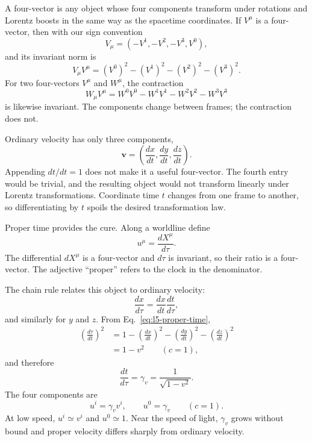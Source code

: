 A four-vector is any object whose four components transform under rotations
and Lorentz boosts in the same way as the spacetime coordinates. If \(V^\mu\)
is a four-vector, then with our sign convention
\begin{equation}
V_\mu=(-V^1,-V^2,-V^3,V^0),
\end{equation}
and its invariant norm is
\begin{equation}
V_\mu V^\mu=(V^0)^2-(V^1)^2-(V^2)^2-(V^3)^2.
\end{equation}
For two four-vectors \(V^\mu\) and \(W^\mu\), the contraction
\begin{equation}
W_\mu V^\mu
=W^0V^0-W^1V^1-W^2V^2-W^3V^3
\end{equation}
is likewise invariant. The components change between frames; the contraction
does not.

Ordinary velocity has only three components,
\begin{equation}
\mathbf v=\left(\frac{dx}{dt},\frac{dy}{dt},\frac{dz}{dt}\right).
\end{equation}
Appending \(dt/dt=1\) does not make it a useful four-vector. The fourth entry
would be trivial, and the resulting object would not transform linearly under
Lorentz transformations. Coordinate time \(t\) changes from one frame to
another, so differentiating by \(t\) spoils the desired transformation law.

Proper time provides the cure. Along a worldline define
\begin{equation}
u^\mu=\frac{dX^\mu}{d\tau}.
\label{eq:l5-four-velocity}
\end{equation}
The differential \(dX^\mu\) is a four-vector and \(d\tau\) is invariant, so
their ratio is a four-vector. The adjective ``proper'' refers to the clock in
the denominator.

The chain rule relates this object to ordinary velocity:
\begin{equation}
\frac{dx}{d\tau}=\frac{dx}{dt}\frac{dt}{d\tau},
\end{equation}
and similarly for \(y\) and \(z\). From
Eq.~\eqref{eq:l5-proper-time},
\begin{align}
\left(\frac{d\tau}{dt}\right)^2
&=1-\left(\frac{dx}{dt}\right)^2
    -\left(\frac{dy}{dt}\right)^2
    -\left(\frac{dz}{dt}\right)^2\nonumber\\
&=1-v^2
\qquad(c=1),
\end{align}
and therefore
\begin{equation}
\frac{dt}{d\tau}=\gamma_v=\frac{1}{\sqrt{1-v^2}}.
\end{equation}
The four components are
\begin{equation}
u^i=\gamma_v v^i,
\qquad
u^0=\gamma_v
\qquad(c=1).
\label{eq:l5-four-velocity-components}
\end{equation}
At low speed, \(u^i\simeq v^i\) and \(u^0\simeq1\). Near the speed of light,
\(\gamma_v\) grows without bound and proper velocity differs sharply from
ordinary velocity.


